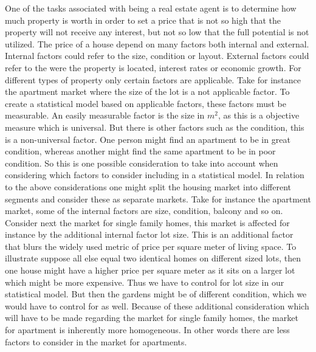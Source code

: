 \label{ch:introduction}

One of the tasks associated with being a real estate agent is to determine how much property is worth in order to set a price that is not so high that the property will not receive any interest, but not so low that the full potential is not utilized.
The price of a house depend on many factors both internal and external.
Internal factors could refer to the size, condition or layout.
External factors could refer to the were the property is located, interest rates or economic growth.
For different types of property only certain factors are applicable.
Take for instance the apartment market where the size of the lot is a not applicable factor.
To create a statistical model based on applicable factors, these factors must be measurable.
An easily measurable factor is the size in $m^2$, as this is a objective measure which is universal.
But there is other factors such as the condition, this is a non-universal factor.
One person might find an apartment to be in great condition, whereas another might find the same apartment to be in poor condition.
So this is one possible consideration to take into account when considering which factors to consider including in a statistical model.
In relation to the above considerations one might split the housing market into different segments and consider these as separate markets.
Take for instance the apartment market, some of the internal factors are size, condition, balcony and so on.
Consider next the market for single family homes, this market is affected for instance by the additional internal factor lot size.
This is an additional factor that blurs the widely used metric of price per square meter of living space.
To illustrate suppose all else equal two identical homes on different sized lots, then one house might have a higher price per square meter as it sits on a larger lot which might be more expensive.
Thus we have to control for lot size in our statistical model.
But then the gardens might be of different condition, which we would have to control for as well.
Because of these additional consideration which will have to be made regarding the market for single family homes, the market for apartment is inherently more homogeneous.
In other words there are less factors to consider in the market for apartments.


